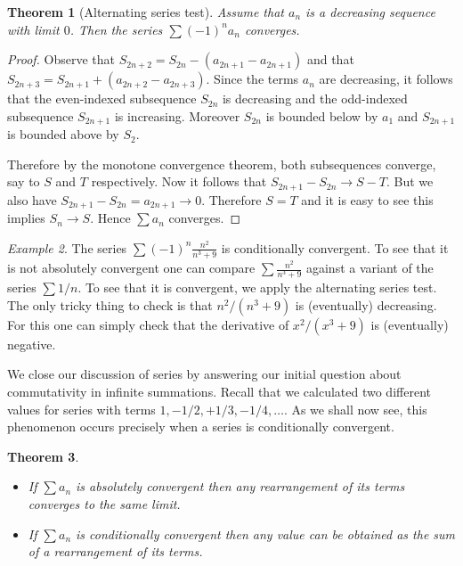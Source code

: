 \documentclass[11pt,oneside]{amsbook}
\theoremstyle{definition}
\theoremstyle{plain}
\newtheorem{thm}{Theorem}[section]
\theoremstyle{definition}
\theoremstyle{remark}
\newtheorem{example}[thm]{Example}
\numberwithin{equation}{section}
\numberwithin{figure}{section}
\begin{document}
\begin{thm}[Alternating series test]
  Assume that $a_n$ is a decreasing sequence with limit $0$. Then the series $\sum(-1)^na_n$ converges.
\end{thm}

\begin{proof}
  Observe that $S_{2n+2}=S_{2n}-(a_{2n+1}-a_{2n+1})$ and that $S_{2n+3}=S_{2n+1}+(a_{2n+2}-a_{2n+3})$. Since the terms $a_n$ are decreasing, it follows that the even-indexed subsequence $S_{2n}$ is decreasing and the odd-indexed subsequence $S_{2n+1}$ is increasing. Moreover $S_{2n}$ is bounded below by $a_1$ and $S_{2n+1}$ is bounded above by $S_2$.

  Therefore by the monotone convergence theorem, both subsequences converge, say to $S$ and $T$ respectively. Now it follows that $S_{2n+1}-S_{2n}\to S-T$. But we also have $S_{2n+1}-S_{2n}=a_{2n+1}\to0$. Therefore $S=T$ and it is easy to see this implies $S_n\to S$. Hence $\sum a_n$ converges.
\end{proof}

\begin{example}
  The series $\sum(-1)^n\frac{n^2}{n^3+9}$ is conditionally convergent. To see that it is not absolutely convergent one can compare $\sum\frac{n^2}{n^3+9}$ against a variant of the series $\sum 1/n$. To see that it is convergent, we apply the alternating series test. The only tricky thing to check is that $n^2/(n^3+9)$ is (eventually) decreasing. For this one can simply check that the derivative of $x^2/(x^3+9)$ is (eventually) negative.
\end{example}

We close our discussion of series by answering our initial question about commutativity in infinite summations. Recall that we calculated two different values for series with terms $1,-1/2,+1/3,-1/4,\ldots$. As we shall now see, this phenomenon occurs precisely when a series is conditionally convergent.

\begin{thm}
  \begin{itemize}
  \item If $\sum a_n$ is absolutely convergent then any rearrangement of its terms converges to the same limit.
  \item If $\sum a_n$ is conditionally convergent then any value can be obtained as the sum of a rearrangement of its terms.
  \end{itemize}
\end{thm}
\end{document}
